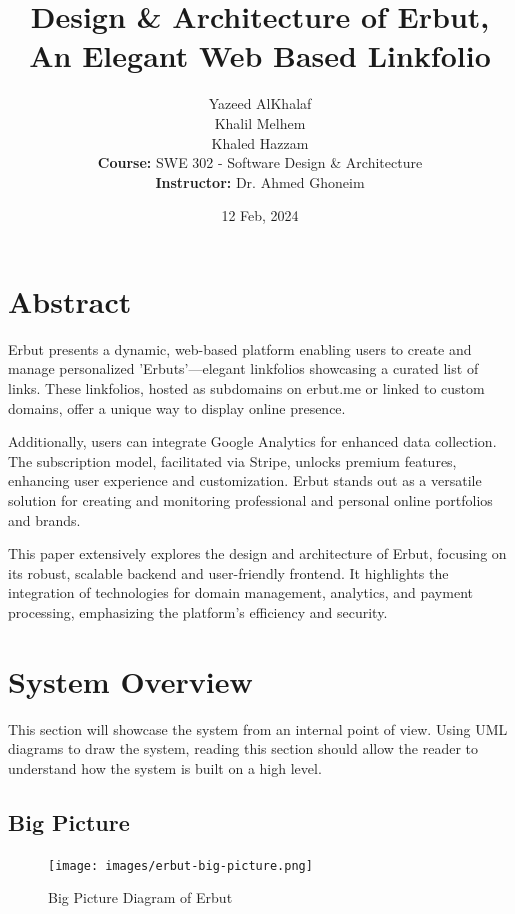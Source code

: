 \documentclass[a4paper]{report}
\title{Design \& Architecture of Erbut, An Elegant Web Based Linkfolio}
\author{
    Yazeed AlKhalaf \\
    Khalil Melhem \\
    Khaled Hazzam \\
    \textbf{Course:} SWE 302 - Software Design \& Architecture \\
    \textbf{Instructor:} Dr. Ahmed Ghoneim
}
\date{12 Feb, 2024}
\begin{document}
\maketitle

\newpage

\tableofcontents

\chapter*{Abstract}

Erbut presents a dynamic, web-based platform enabling users to create and manage personalized 'Erbuts'—elegant linkfolios showcasing a curated list of links. These linkfolios, hosted as subdomains on erbut.me or linked to custom domains, offer a unique way to display online presence.

Additionally, users can integrate Google Analytics for enhanced data collection. The subscription model, facilitated via Stripe, unlocks premium features, enhancing user experience and customization. Erbut stands out as a versatile solution for creating and monitoring professional and personal online portfolios and brands.

This paper extensively explores the design and architecture of Erbut, focusing on its robust, scalable backend and user-friendly frontend. It highlights the integration of technologies for domain management, analytics, and payment processing, emphasizing the platform's efficiency and security.

\newpage

\chapter{System Overview}

This section will showcase the system from an internal point of view. Using UML diagrams to draw the system, reading this section should allow the reader to understand how the system is built on a high level.

\section{Big Picture}

\begin{figure}[h!]
    \centering
    \texttt{[image: images/erbut-big-picture.png]}
    \caption{Big Picture Diagram of Erbut}
    \label{fig:bigpicture}
\end{figure}
\end{document}
